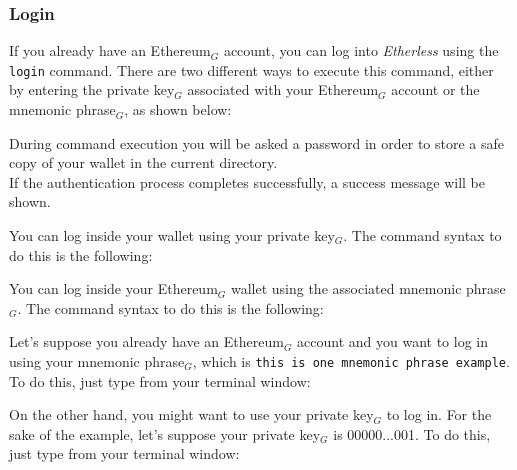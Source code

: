 \subsubsection{Login}
If you already have an Ethereum$_{G}$ account, you can log into \textit{Etherless} using the \texttt{login} command. There are two different ways to execute this command, either by entering the private key$_{G}$ associated with your Ethereum$_{G}$ account or the mnemonic phrase$_{G}$, as shown below: \\
\begin{center}
\end{center}
During command execution you will be asked a password in order to store a safe copy of your wallet in the current directory. \\
If the authentication process completes successfully, a success message will be shown.

You can log inside your wallet using your private key$_{G}$. The command syntax to do this is the following:
\begin{center}
\end{center}

You can log inside your Ethereum$_{G}$ wallet using the associated mnemonic phrase$_{G}$. The command syntax to do this is the following:
\begin{center}
\end{center}

Let's suppose you already have an Ethereum$_{G}$ account and you want to log in using your mnemonic phrase$_{G}$, which is \texttt{this is one mnemonic phrase example}. To do this, just type from your terminal window:
\begin{center}
\end{center}

On the other hand, you might want to use your private key$_{G}$ to log in. For the sake of the example,  let's suppose your private key$_{G}$ is 00000...001. To do this, just type from your terminal window:
\begin{center}
\end{center}

